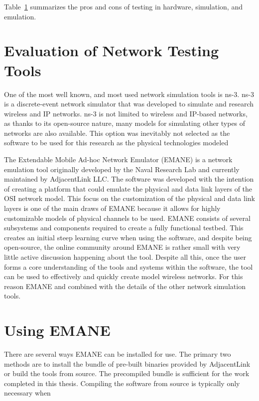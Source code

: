 \begin{table}
\begin{adjustbox}{width=\textwidth, center=\textwidth}
\begin{tabular}{|l|l|l|}
			\hline
		\end{tabular}
	\end{adjustbox}
	\label{simtable}
\end{table}

Table~\ref{simtable} summarizes the pros and cons of testing in hardware, simulation, and emulation.


\section{Evaluation of Network Testing Tools} %
One of the most well known, and most used network simulation tools is ns-3.
ns-3 is a discrete-event network simulator that was developed to simulate and research wireless and IP networks.
ns-3 is not limited to wireless and IP-based networks, as thanks to its open-source nature, many models for simulating other types of networks are also available.
This option was inevitably not selected as the software to be used for this research as the physical technologies modeled 

The Extendable Mobile Ad-hoc Network Emulator (EMANE) is a network emulation tool originally developed by the Naval Research Lab and currently maintained by AdjacentLink LLC.
The software was developed with the intention of creating a platform that could emulate the physical and data link layers of the OSI network model.
This focus on the customization of the physical and data link layers is one of the main draws of EMANE because it allows for highly customizable models of physical channels to be used. 
EMANE consists of several subsystems and components required to create a fully functional testbed.
This creates an initial steep learning curve when using the software, and despite being open-source, the online community around EMANE is rather small with very little active discussion happening about the tool.
Despite all this, once the user forms a core understanding of the tools and systems within the software, the tool can be used to effectively and quickly create model wireless networks.
For this reason EMANE and combined with the details of the other network simulation tools.

\section{Using EMANE}
There are several ways EMANE can be installed for use.
The primary two methods are to install the bundle of pre-built binaries provided by AdjacentLink or build the tools from source.
The precompiled bundle is sufficient for the work completed in this thesis. Compiling the software from source is typically only necessary when 
        
